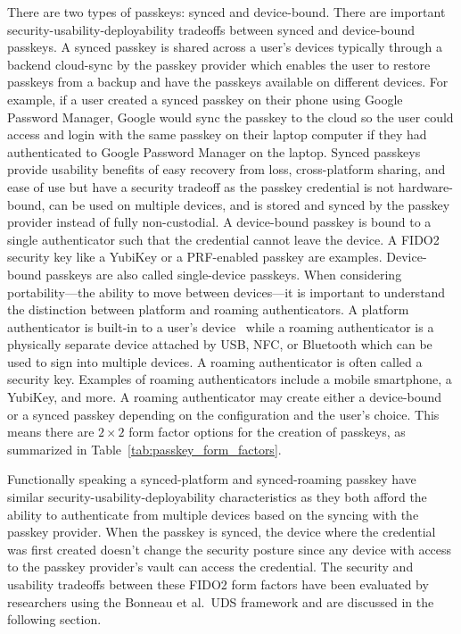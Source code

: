 There are two types of passkeys: synced and device-bound. There are important security-usability-deployability tradeoffs between synced and device-bound passkeys. A synced passkey is shared across a user's devices typically through a backend cloud-sync by the passkey provider which enables the user to restore passkeys from a backup and have the passkeys available on different devices. For example, if a user created a synced passkey on their phone using Google Password Manager, Google would sync the passkey to the cloud so the user could access and login with the same passkey on their laptop computer if they had authenticated to Google Password Manager on the laptop. Synced passkeys provide usability benefits of easy recovery from loss, cross-platform sharing, and ease of use but have a security tradeoff as the passkey credential is not hardware-bound, can be used on multiple devices, and is stored and synced by the passkey provider instead of fully non-custodial. A device-bound passkey is bound to a single authenticator such that the credential cannot leave the device. A FIDO2 security key like a YubiKey or a PRF-enabled passkey are examples. Device-bound passkeys are also called single-device passkeys. When considering portability---the ability to move between devices---it is important to understand the distinction between platform and roaming authenticators. A platform authenticator is built-in to a user's device~\cite{passkeys_dev_terms} while a roaming authenticator is a physically separate device attached by USB, NFC, or Bluetooth which can be used to sign into multiple devices. A roaming authenticator is often called a security key. Examples of roaming authenticators include a mobile smartphone, a YubiKey, and more. A roaming authenticator may create either a device-bound or a synced passkey depending on the configuration and the user's choice. This means there are $2\times 2$ form factor options for the creation of passkeys, as summarized in Table~\ref{tab:passkey_form_factors}.



Functionally speaking a synced-platform and synced-roaming passkey have similar security-usability-deployability characteristics as they both afford the ability to authenticate from multiple devices based on the syncing with the passkey provider. When the passkey is synced, the device where the credential was first created doesn't change the security posture since any device with access to the passkey provider's vault can access the credential. The security and usability tradeoffs between these FIDO2 form factors have been evaluated by researchers using the Bonneau et al.\ UDS framework and are discussed in the following section.

